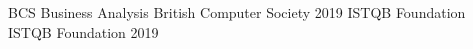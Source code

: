 
\begin{cvhonors}

  \cvhonor
    {BCS Business Analysis} %
    {British Computer Society} %
    {} %
    {2019} %
\cvhonor
    {ISTQB Foundation} %
    {ISTQB Foundation} %
    {} %
    {2019} %

\end{cvhonors}
